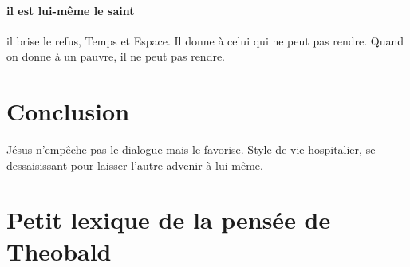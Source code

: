 \paragraph{il est lui-même le saint} il brise le refus, Temps et Espace. Il donne à celui qui ne peut pas rendre. Quand on donne à un pauvre, il ne peut pas rendre.


\section{Conclusion}


Jésus n'empêche pas le dialogue mais le favorise. 
Style de vie hospitalier, se dessaisissant pour laisser l'autre advenir à lui-même. 
\section{Petit lexique de la pensée de Theobald}




 



 





 




 







